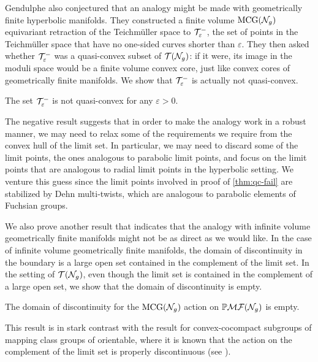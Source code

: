 \documentclass[12pt, reqno]{amsart}
\begin{document}
Gendulphe also conjectured that an analogy might be made with geometrically finite hyperbolic manifolds.
They constructed a finite volume $\mathrm{MCG}(\mathcal{N}_g)$ equivariant retraction of the Teichm\"uller space to $\mathcal{T}_{\varepsilon}^{-}$, the set of points in the Teichm\"uller space that have no one-sided curves shorter than $\varepsilon$.
They then asked whether $\mathcal{T}_{\varepsilon}^{-}$ was a quasi-convex subset of $\mathcal{T}(\mathcal{N}_g)$: if it were, its image in the moduli space would be a finite volume convex core, just like convex cores of geometrically finite manifolds.
We show that $\mathcal{T}_{\varepsilon}^{-}$ is actually not quasi-convex.
\begingroup
\def\thetheorem{\ref{thm:qc-fail}}
\begin{theorem}
  The set $\mathcal{T}_{\varepsilon}^{-}$ is not quasi-convex for any $\varepsilon > 0$.
\end{theorem}
\addtocounter{theorem}{-1}
\endgroup
The negative result suggests that in order to make the analogy work in a robust manner, we may need to relax some of the requirements we require from the convex hull of the limit set. In particular, we may need to discard some of the limit points, the ones analogous to parabolic limit points, and focus on the limit points that are analogous to radial limit points in the hyperbolic setting.
We venture this guess since the limit points involved in proof of \autoref{thm:qc-fail} are stabilized by Dehn multi-twists, which are analogous to parabolic elements of Fuchsian groups.

We also prove another result that indicates that the analogy with infinite volume geometrically finite manifolds might not be as direct as we would like.
In the case of infinite volume geometrically finite manifolds, the domain of discontinuity in the boundary is a large open set contained in the complement of the limit set.
In the setting of $\mathcal{T}(\mathcal{N}_g)$, even though the limit set is contained in the complement of a large open set, we show that the domain of discontinuity is empty.
\begingroup
\def\thetheorem{\ref{thm:dod-is-empty}}
\begin{theorem}
  The domain of discontinuity for the $\mathrm{MCG}(\mathcal{N}_g)$ action on $\mathbb{P}\mathcal{MF}(\mathcal{N}_g)$ is empty.
\end{theorem}
\addtocounter{theorem}{-1}
\endgroup
This result is in stark contrast with the result for convex-cocompact subgroups of mapping class groups of orientable, where it is known that the action on the complement of the limit set is properly discontinuous (see \cite{farb2002convex}).
\end{document}
